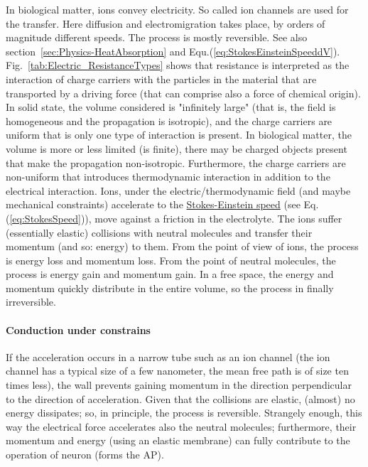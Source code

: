 In biological matter, ions convey electricity. So called ion channels
are used for the transfer. Here diffusion and electromigration takes place, by orders of magnitude different speeds. 
The process is mostly reversible.  See also section~\ref{sec:Physics-HeatAbsorption} and Equ.(\ref{eq:StokesEinsteinSpeeddV}). 
Fig.~\ref{tab:Electric_ResistanceTypes} shows that resistance 
is interpreted as the interaction of charge carriers with the particles in the material that are transported by a driving force (that can comprise also a force of chemical origin).
In solid state, the volume considered is "infinitely large" (that is, the field is homogeneous
and the propagation is isotropic), and the charge carriers are uniform that is only one type of interaction is present.
In biological matter, the volume is more or less limited (is finite), there may be charged objects present that make the propagation non-isotropic. Furthermore, the charge carriers are non-uniform
that introduces thermodynamic interaction in addition to the electrical interaction.
Ions, under the electric/thermodynamic field (and maybe mechanical constraints) accelerate to the \hyperlink{phys:StokesSpeed}{Stokes-Einstein speed} (see Eq.(\ref{eq:StokesSpeed})), move against a friction in the electrolyte.
The ions suffer (essentially elastic) collisions with neutral molecules and transfer their momentum (and so: energy) to them. 
From the point of view of ions, the process is energy loss and momentum loss.
From the point of neutral molecules, the process is energy gain and momentum gain. In a free space, the energy and momentum quickly distribute in the entire volume, so the
process in finally irreversible.

\paragraph{Conduction under constrains\label{sec:PHYSICS_ConductionConstrained}}

If the acceleration occurs in a narrow tube 
such as an ion channel (the ion channel has a typical size of a few nanometer, the mean free path is of size ten times less), the wall prevents gaining momentum in the 
direction perpendicular to the direction of acceleration. 
Given that the collisions are elastic, (almost) no energy dissipates;
so, in principle, the process is reversible.
Strangely enough, this way the electrical force
accelerates also the neutral molecules; furthermore, their momentum and energy (using an elastic membrane) can fully contribute to the operation
of neuron (forms the \gls{AP}). 


